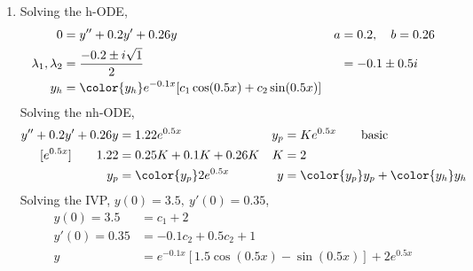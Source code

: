 \begin{enumerate}
    \item Solving the h-ODE,
          \begin{align}
              0                        & = y'' + 0.2y' + 0.26y                                      & a & = 0.2, \quad b = 0.26 \\
              \lambda_{1}, \lambda_{2} & = \frac{-0.2 \pm i\sqrt{1}}{2}                             &   & = -0.1 \pm 0.5i       \\
              y_{h}                    & = \color{y_h} e^{-0.1x}[c_{1}\cos(0.5x) + c_{2}\sin(0.5x)]
          \end{align}
          Solving the nh-ODE,
          \begin{align}
              y'' + 0.2y' + 0.26y    & = 1.22e^{0.5x}          & y_{p} & = Ke^{0.5x} \qquad \text{basic}             \\
              [e^{0.5x}] \qquad 1.22 & = 0.25K + 0.1K + 0.26K  & K     & = 2                                         \\
              y_{p}                  & = \color{y_p} 2e^{0.5x} & y     & = {\color{y_p} y_{p}} + {\color{y_h} y_{h}}
          \end{align}
          Solving the IVP, $ y(0) = 3.5,\ y'(0) = 0.35 $,
          \begin{align}
              y(0) = 3.5   & = c_{1} + 2                                         \\
              y'(0) = 0.35 & = -0.1c_{2} + 0.5c_{2} + 1                          \\
              y            & = e^{-0.1x}[1.5\cos(0.5x) - \sin(0.5x)] + 2e^{0.5x}
          \end{align}


\end{enumerate}
